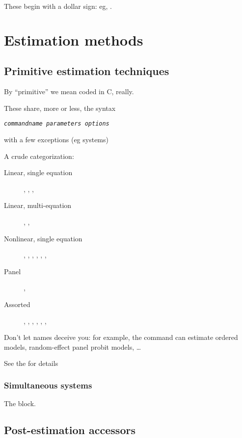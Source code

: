 These begin with a dollar sign: eg, .

\chapter{Estimation methods}
\label{chap:estimation}

\section{Primitive estimation techniques}
\label{sec:canned}

By ``primitive'' we mean coded in C, really.

These share, more or less, the syntax
\begin{flushleft}
\texttt{\emph{commandname parameters options}}
\end{flushleft}
with a few exceptions (eg systems)

A crude categorization: 
\begin{description}
\item[Linear, single equation] , , ,
\item[Linear, multi-equation] , ,  
\item[Nonlinear, single equation] , ,
  , , , ,
\item[Panel] , 
\item[Assorted] , , ,
  , , , 
\end{description}

Don't let names deceive you: for example, the  command can
estimate ordered models, random-effect panel probit models, \ldots

See the \GCR{} for details

\subsection{Simultaneous systems}

The  block.

\section{Post-estimation accessors}
\label{sec:postest-accessors}

